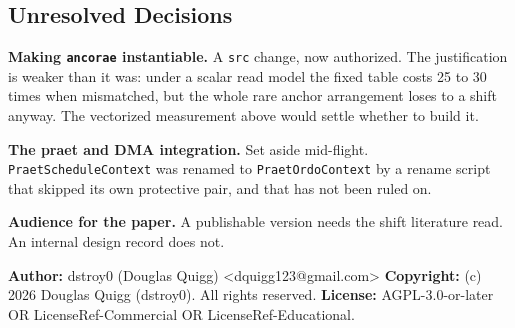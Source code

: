 \subsection{Unresolved Decisions}

\textbf{Making \texttt{ancorae} instantiable.} A \texttt{src} change, now authorized. The justification is weaker than it was: under a scalar read model the fixed table costs 25 to 30 times when mismatched, but the whole rare anchor arrangement loses to a shift anyway. The vectorized measurement above would settle whether to build it.

\textbf{The praet and DMA integration.} Set aside mid-flight. \texttt{Praet\allowbreak{}Schedule\allowbreak{}Context} was renamed to \texttt{Praet\allowbreak{}Ordo\allowbreak{}Context} by a rename script that skipped its own protective pair, and that has not been ruled on.

\textbf{Audience for the paper.} A publishable version needs the shift literature read. An internal design record does not.

\medskip

\textbf{Author:} dstroy0 (Douglas Quigg) <dquigg123@gmail.com> \textbf{Copyright:} (c) 2026 Douglas Quigg (dstroy0). All rights reserved. \textbf{License:} AGPL-3.0-or-later OR LicenseRef-Commercial OR LicenseRef-Educational.

